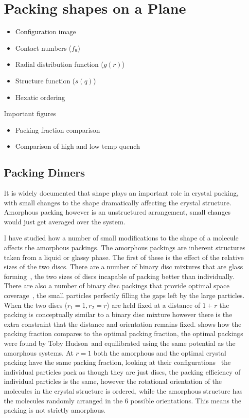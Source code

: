 \chapter{Packing shapes on a Plane}

\begin{itemize}
    \item Configuration image
    \item Contact numbers ($f_6$)
    \item Radial distribution function ($g(r)$)
    \item Structure function ($s(q)$)
    \item Hexatic ordering 
\end{itemize}

Important figures
\begin{itemize}
    \item Packing fraction comparison
    \item Comparison of high and low temp quench
\end{itemize}

\section{Packing Dimers}

It is widely documented that shape plays an important role in crystal packing\tocite, with small changes to the shape dramatically affecting the crystal structure. Amorphous packing however is an unstructured arrangement, small changes would just get averaged over the system.

I have studied how a number of small modifications to the shape of a molecule affects the amorphous packings. The amorphous packings are inherent structures taken from a liquid or glassy phase. The first of these is the effect of the relative sizes of the two discs. There are a number of binary disc mixtures that are glass forming~\tocite, the two sizes of discs incapable of packing better than individually. There are also a number of binary disc packings that provide optimal space coverage~\tocite, the small particles perfectly filling the gaps left by the large particles. When the two discs ($r_1 = 1, r_2 = r$) are held fixed at a distance of $1+r$ the packing is conceptually similar to a binary disc mixture however there is the extra constraint that the distance and orientation remains fixed.  shows how the packing fraction compares to the optimal packing fraction, the optimal packings were found by Toby Hudson~\tocite and equilibrated using the same potential as the amorphous systems\toref. At $r = 1$ both the amorphous and the optimal crystal packing have the same packing fraction, looking at their configurations~ the individual particles pack as though they are just discs, the packing efficiency of individual particles is the same, however the rotational orientation of the molecules in the crystal structure is ordered, while the amorphous structure has the molecules randomly arranged in the 6 possible orientations\tocheck. This means the packing is not strictly amorphous.

